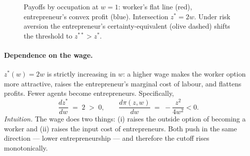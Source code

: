 \documentclass[11pt,a4paper]{article}
\begin{document}
\begin{figure}[ht]
\centering
{}
\caption{\small Payoffs by occupation at $w=1$: worker's flat line (red), entrepreneur's convex profit (blue). Intersection $z^{*}=2w$. Under risk aversion the entrepreneur's certainty-equivalent (olive dashed) shifts the threshold to $z^{**}>z^{*}$.}
\label{fig:q2_occchoice}
\end{figure}

\paragraph{Dependence on the wage.}
$z^{*}(w)=2w$ is strictly increasing in $w$: a higher wage makes the worker option more attractive, raises the entrepreneur's marginal cost of labour, and flattens profits. Fewer agents become entrepreneurs. Specifically,
\begin{equation}
\frac{dz^{*}}{dw}\;=\;2\;>\;0,\qquad
\frac{d\pi(z,w)}{dw}\;=\;-\frac{z^{2}}{4w^{2}}<0.
\label{eq:q2_cs}
\end{equation}
\emph{Intuition.} The wage does two things: (i) raises the outside option of becoming a worker and (ii) raises the input cost of entrepreneurs. Both push in the same direction --- lower entrepreneurship --- and therefore the cutoff rises monotonically.
\end{document}
